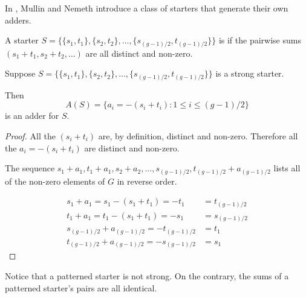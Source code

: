 In
\cite{mullinFurnishingRoomSquares1969},
Mullin and Nemeth introduce a class of starters that generate their own adders.

A starter
$S = \{\{s_1, t_1\}, \{s_2, t_2\}, \ldots, \{s_{(g - 1)/2}, t_{(g - 1)/2}\}\}$
is  if
the pairwise sums
$(s_1 + t_1, s_2 + t_2, \ldots)$
are all distinct and non-zero.

\begin{theorem}
\label{thm:furnishing}
Suppose
$S = \{\{s_1, t_1\}, \{s_2, t_2\}, \ldots, \{s_{(g - 1)/2}, t_{(g - 1)/2}\}\}$
is a strong starter.

Then
\begin{equation}
 A(S) = \{a_i = -(s_i + t_i):1 \leq i \leq (g - 1)/2\}
\end{equation}
is an adder for $S$.
\end{theorem}

\begin{proof}
All the $(s_i + t_i)$ are, by definition, distinct and non-zero.
Therefore all the $a_i = -(s_i + t_i)$ are distinct and non-zero.

The sequence $s_1 + a_1, t_1 + a_1, s_2 + a_2, \ldots, s_{(g - 1)/2}, t_{(g - 1)/2} + a_{(g - 1)/2}$ lists all of the non-zero elements of $G$ in reverse order. 

\begin{align*}
      s_1 + a_1 = s_1 - (s_1 + t_1) = -t_1 &= t_{(g - 1)/2}  \\
      t_1 + a_1 = t_1 - (s_1 + t_1) = -s_1 &= s_{(g - 1)/2}  \\
      s_{(g - 1)/2} + a_{(g - 1)/2} = -t_{(g - 1)/2} &= t_1  \\
      t_{(g - 1)/2} + a_{(g - 1)/2} = -s_{(g - 1)/2} &= s_1 
\end{align*}

\end{proof}

Notice that a patterned starter is not strong.
On the contrary, the sums of a patterned starter's pairs are all identical.


